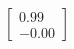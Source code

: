 \documentclass[preview]{standalone}
\begin{document}
\begin{align*}
\begin{bmatrix} 0.99 \\ -0.00 \end{bmatrix}
\end{align*}
\end{document}
